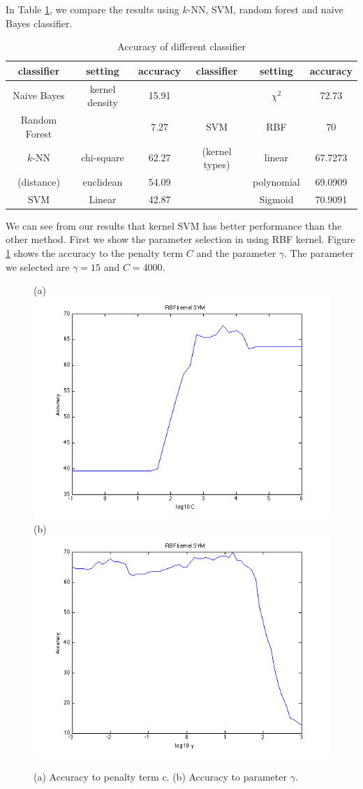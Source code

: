 \documentclass{article} %
\begin{document}
In Table \ref{tbl:classifers}, we compare the results using $k$-NN, SVM, random forest and naive Bayes classifier.


\begin{table}[t]
\caption{Accuracy of different classifier}
\begin{center}
\label{tbl:classifers}
\begin{tabular}{|c|c|c|c|c|c|}
\hline
   classifier  & setting      &accuracy   & classifier    & setting      & accuracy\\
\hline
Naive Bayes  & kernel density  & 15.91       &     &$\chi^2$  &72.73\\ \cline{1-3} \cline{5-6}
Random Forest &                & 7.27     &   SVM    & RBF               &70\\ \cline{1-3} \cline{5-6}
$k$-NN     & chi-square        & 62.27    &    (kernel types)    & linear            &67.7273\\ \cline{2-3} \cline{5-6}
(distance) & euclidean         & 54.09   &       & polynomial        &69.0909\\ \cline{1-3} \cline{5-6}
SVM& Linear  &42.87   &    & Sigmoid           &70.9091\\ \hline
\end{tabular}
\end{center}
\end{table}

We can see from our results that kernel SVM has better performance than the other method. First we show the parameter selection in using RBF kernel. Figure \ref{fig:RBF} shows the accuracy to the penalty term $C$ and the parameter $\gamma$. The parameter we selected are $\gamma = 15$ and $C = 4000$.

\begin{figure}[ht!]
    \centering
    {(a)\includegraphics[width=0.38\linewidth]{../Figure/RBF_cost_accuracy}
    (b)\includegraphics[width=0.38\linewidth]{../Figure/RBF_gamma_accuracy}}
    \caption{(a) Accuracy to penalty term c. (b) Accuracy to parameter $\gamma$. }
    \label{fig:RBF}
\end{figure}
\end{document}

